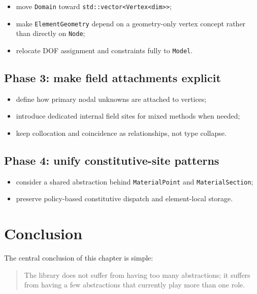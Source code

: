 \begin{itemize}[nosep]
  \item move \texttt{Domain} toward \texttt{std::vector<Vertex<dim>>};
  \item make \texttt{ElementGeometry} depend on a geometry-only vertex concept
        rather than directly on \texttt{Node};
  \item relocate DOF assignment and constraints fully to \texttt{Model}.
\end{itemize}

\subsection*{Phase 3: make field attachments explicit}

\begin{itemize}[nosep]
  \item define how primary nodal unknowns are attached to vertices;
  \item introduce dedicated internal field sites for mixed methods when needed;
  \item keep collocation and coincidence as relationships, not type collapse.
\end{itemize}

\subsection*{Phase 4: unify constitutive-site patterns}

\begin{itemize}[nosep]
  \item consider a shared abstraction behind \texttt{MaterialPoint} and
        \texttt{MaterialSection};
  \item preserve policy-based constitutive dispatch and element-local storage.
\end{itemize}


\section{Conclusion}
\label{sec:domain-ontology-conclusion}

The central conclusion of this chapter is simple:

\begin{quote}
The library does not suffer from having too many abstractions; it suffers from
having a few abstractions that currently play more than one role.
\end{quote}

